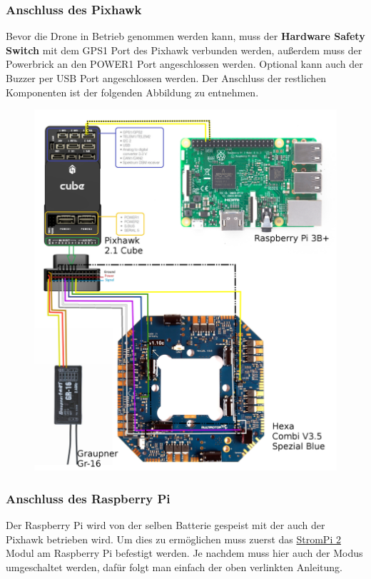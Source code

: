 \documentclass[12pt]{article}
\begin{document}
\subsubsection{Anschluss des Pixhawk}
Bevor die Drone in Betrieb genommen werden kann, muss der \textbf{Hardware Safety Switch} mit dem GPS1 Port des Pixhawk verbunden werden, außerdem muss der Powerbrick an den POWER1 Port angeschlossen werden.
Optional kann auch der Buzzer per USB Port angeschlossen werden.
Der Anschluss der restlichen Komponenten ist der folgenden Abbildung zu entnehmen.
\begin{figure}[H]
\centering
\includegraphics[width=\textwidth]{pixhawk-con.png}
\end{figure}

\subsubsection{Anschluss des Raspberry Pi}
Der Raspberry Pi wird von der selben Batterie gespeist mit der auch der Pixhawk betrieben wird.
Um dies zu ermöglichen muss zuerst das \hyperlink{http://downloads.joy-it.net/send/37-strompi-2/91-strompi-2-anleitung}{StromPi 2} Modul am Raspberry Pi befestigt werden. Je nachdem muss hier auch der Modus umgeschaltet werden, dafür folgt man einfach der oben verlinkten Anleitung.
\end{document}
